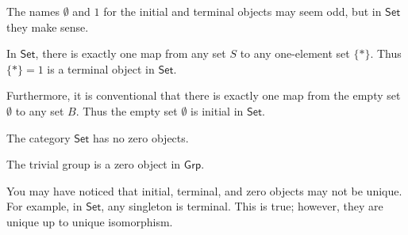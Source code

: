 \documentclass[notes.tex]{subfiles}
\begin{document}
The names $\emptyset$ and $1$ for the initial and terminal objects may seem odd, but in $\mathsf{Set}$ they make sense.

\begin{example}
  In $\mathsf{Set}$, there is exactly one map from any set $S$ to any one-element set $\{*\}$. Thus $\{*\} = 1$ is a terminal object in $\mathsf{Set}$.

  Furthermore, it is conventional that there is exactly one map from the empty set $\emptyset$ to any set $B$. Thus the empty set $\emptyset$ is initial in $\mathsf{Set}$.

  The category $\mathsf{Set}$ has no zero objects.
\end{example}

\begin{example}
  The trivial group is a zero object in $\mathsf{Grp}$.
\end{example}

You may have noticed that initial, terminal, and zero objects may not be unique. For example, in $\mathsf{Set}$, any singleton is terminal. This is true; however, they are unique up to unique isomorphism.
\end{document}
